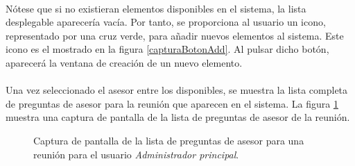   \paragraph{}Nótese que si no existieran elementos disponibles en el sistema,
  la lista desplegable aparecería vacía. Por tanto, se proporciona al usuario
  un icono, representado por una cruz verde, para añadir nuevos elementos al
  sistema. Este icono es el mostrado en la figura \ref{capturaBotonAdd}. Al
  pulsar dicho botón, aparecerá la ventana de creación de un nuevo elemento.

  \paragraph{}Una vez seleccionado el asesor entre los disponibles, se muestra
  la lista completa de preguntas de asesor para la reunión que aparecen en el
  sistema. La figura
  \ref{capturaPantallaListaPreguntasAsesorReunionAdminPrincipal} muestra una
  captura de pantalla de la lista de preguntas de asesor de la reunión.

  \begin{figure}[!ht]
    \begin{center}
      \caption{Captura de pantalla de la lista de preguntas de asesor para una reunión para el usuario \textit{Administrador principal}.}
      \label{capturaPantallaListaPreguntasAsesorReunionAdminPrincipal}
    \end{center}
  \end{figure}
